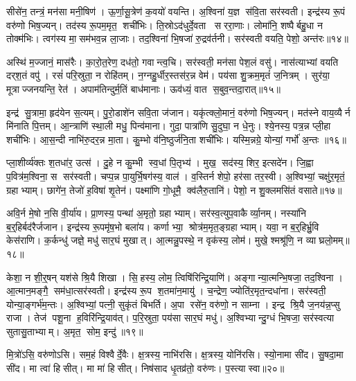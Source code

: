 सीसे॑न॒ तन्त्रं॒ मन॑सा मनी॒षिण॑।
ऊ॒र्णा॒सू॒त्रेण॑ क॒वयो॑ वयन्ति।
अ॒श्विना॑ य॒ज्ञ स॑वि॒ता सर॑स्वती।
इन्द्र॑स्य रू॒पं वरु॑णो भिष॒ज्यन्।
तद॑स्य रू॒पम॒मृत॒ शची॑भिः।
ति॒स्रोऽद॑धुर्दे॒वता सररा॒णाः।
लोमा॑नि॒ शष्पैर्बहु॒धा न तोक्म॑भिः।
त्वग॑स्य मा॒सम॑भव॒न्न ला॒जाः।
तद॒श्विना॑ भि॒षजा॑ रु॒द्रव॑र्तनी।
सर॑स्वती वयति॒ पेशो॒ अन्त॑रः॥१४॥

अस्थि॑ म॒ज्जानं॒ मास॑रैः।
का॒रो॒त॒रेण॒ दध॑तो॒ गवान्त्व॒चि।
सर॑स्वती॒ मन॑सा पेश॒लं वसु॑।
नास॑त्याभ्यां वयति दर्‌श॒तं वपु॑।
रसं॑ परि॒स्रुता॒ न रोहि॑तम्।
न॒ग्नहु॒र्धीर॒स्तस॑र॒न्न वेम॑।
पय॑सा शु॒क्रम॒मृतं॑ ज॒नित्रम्।
सुर॑या॒ मूत्राज्जनयन्ति॒ रेत॑।
अपाम॑तिन्दुर्म॒तिं बाध॑मानाः।
ऊव॑ध्यं॒ वात स॒बुव॒न्तदा॒रात्॥१५॥

इन्द्र॑ सु॒त्रामा॒ हृद॑येन स॒त्यम्।
पु॒रो॒डाशे॑न सवि॒ता ज॑जान।
यकृ॑त्क्लो॒मानं॒ वरु॑णो भिष॒ज्यन्।
मत॑स्ने वाय॒व्यैर्न मि॑नाति पि॒त्तम्।
आ॒न्त्राणि॑ स्था॒ली मधु॒ पिन्व॑माना।
गुदा॒ पात्रा॑णि सु॒दुघा॒ न धे॒नुः।
श्ये॒नस्य॒ पत्र॒न्न प्ली॒हा शची॑भिः।
आ॒स॒न्दी नाभि॑रु॒दर॒न्न मा॒ता।
कु॒म्भो व॑नि॒ष्ठुर्ज॑नि॒ता शची॑भिः।
यस्मि॒न्नग्रे॒ योन्यां॒ गर्भो॑ अ॒न्तः ॥१६॥

प्ला॒शीर्व्य॑क्तः श॒तधा॑र॒ उत्स॑।
दु॒हे न कु॒म्भी स्व॒धां पि॒तृभ्य॑।
मुख॒ सद॑स्य॒ शिर॒ इत्सदे॑न।
जि॒ह्वा प॒वित्र॑म॒श्विना॒ स सर॑स्वती।
चप्प॒न्न पा॒युर्भि॒षग॑स्य॒ वाल॑।
व॒स्तिर्न शेपो॒ हर॑सा तर॒स्वी।
अ॒श्विभ्यां॒ चक्षु॑र॒मृतं॒ ग्रहाभ्याम्।
छागे॑न॒ तेजो॑ ह॒विषा॑ शृ॒तेन॑।
पक्ष्मा॑णि गो॒धूमै॒ क्व॑लैरु॒तानि॑।
पेशो॒ न शु॒क्लमसि॑तं वसाते॥१७॥

अवि॒र्न मे॒षो न॒सि वी॒र्या॑य।
प्रा॒णस्य॒ पन्था॑ अ॒मृतो॒ ग्रहाभ्याम्।
सर॑स्व॒त्युप॒वाकैर्व्या॒नम्।
नस्या॑नि ब॒र्॒हिर्बद॑रैर्जजान।
इन्द्र॑स्य रू॒पमृ॑ष॒भो बला॑य।
कर्णाभ्या॒ श्रोत्र॑म॒मृत॒ङ्ग्रहाभ्याम्।
यवा॒ न ब॒र्॒हिर्भ्रु॒वि केस॑राणि।
क॒र्कन्धु॑ जज्ञे॒ मधु॑ सार॒घं मुखात्।
आ॒त्मन्नु॒पस्थे॒ न वृक॑स्य॒ लोम॑।
मुखे॒ श्मश्रू॑णि॒ न व्याघ्रलो॒मम्॥१८॥

केशा॒ न शी॒र्॒षन्‌ यश॑से श्रि॒यै शिखा।
सि॒हस्य॒ लोम॒ त्विषि॑रिन्द्रि॒याणि॑।
अङ्गान्या॒त्मन्भि॒षजा॒ तद॒श्विना।
आ॒त्मान॒मङ्गै॒ सम॑धा॒त्सर॑स्वती।
इन्द्र॑स्य रू॒प श॒तमा॑न॒मायु॑।
च॒न्द्रेण॒ ज्योति॑र॒मृत॒न्दधा॑ना।
सर॑स्वती॒ योन्या॒ङ्गर्भ॑म॒न्तः।
अ॒श्विभ्यां॒ पत्नी॒ सुकृ॑तं बिभर्ति।
अ॒पा रसे॑न॒ वरु॑णो॒ न साम्ना।
इन्द्र श्रि॒यै ज॒नय॑न्न॒प्सु राजा।
तेज॑ पशू॒ना ह॒विरि॑न्द्रि॒याव॑त्।
प॒रि॒स्रुता॒ पय॑सा सार॒घं मधु॑।
अ॒श्विभ्यान्दु॒ग्धं भि॒षजा॒ सर॑स्वत्या सुतासु॒ताभ्याम्।
अ॒मृत॒ सोम॒ इन्दु॑॥१९॥\anuvakamend[अन्त॑र आ॒राद॒न्तर्व॑साते व्याघ्रलो॒म राजा॑ च॒त्वारि॑ च]

मि॒त्रो॑ऽसि॒ वरु॑णोऽसि।
सम॒हं विश्वैर्दे॒वैः।
क्ष॒त्रस्य॒ नाभि॑रसि।
क्ष॒त्रस्य॒ योनि॑रसि।
स्यो॒नामा सी॑द।
सु॒षदा॒मा सी॑द।
मा त्वा॑ हिसीत्।
मा मा॑ हिसीत्।
निष॑साद धृ॒तव्र॑तो॒ वरु॑णः।
प॒स्त्यास्वा॥२०॥

